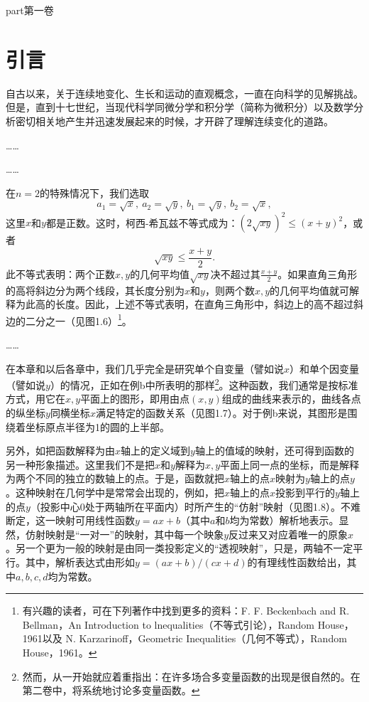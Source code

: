 part{第一卷}


\chapter{引言}
自古以来，关于连续地变化、生长和运动的直观概念，一直在向科学的见解挑战。但是，直到十七世纪，当现代科学同微分学和积分学（简称为微积分）以及数学分析密切相关地产生并迅速发展起来的时候，才开辟了理解连续变化的道路。

……


……

在$n=2$的特殊情况下，我们选取
$$
a_1=\sqrt{x},\ a_2=\sqrt{y},\ b_1=\sqrt{y},\ b_2=\sqrt{x},
$$
这里$x$和$y$都是正数。这时，柯西-希瓦兹不等式成为：$(2\sqrt{xy})^2\leqslant(x+y)^2$，或者
$$
\sqrt{xy}\leqslant\frac{x+y}{2}.
$$
此不等式表明：两个正数$x,y$的几何平均值$\sqrt{xy}$决不超过其$\frac{x+y}{2}$。如果直角三角形的高将斜边分为两个线段，其长度分别为$x$和$y$，则两个数$x,y$的几何平均值就可解释为此高的长度。因此，上述不等式表明，在直角三角形中，斜边上的高不超过斜边的二分之一（见图1.6）\footnote{有兴趣的读者，可在下列著作中找到更多的资料：F. F. Beckenbach and R. Bellman，An Introduction to lnequalities（不等式引论），Random House，1961以及 N. Karzarinoff，Geometric Inequalities（几何不等式），Random House，1961。}。


……

在本章和以后各章中，我们几乎完全是研究单个自变量（譬如说$x$）和单个因变量（譬如说$y$）的情况，正如在例b中所表明的那样\footnote{然而，从一开始就应着重指出：在许多场合多变量函数的出现是很自然的。在第二卷中，将系统地讨论多变量函数。}。这种函数，我们通常是按标准方式，用它在$x,y$平面上的图形，即用由点$(x,y)$组成的曲线来表示的，曲线各点的纵坐标$y$同横坐标$x$满足特定的函数关系（见图1.7）。对于例b来说，其图形是围绕着坐标原点半径为1的圆的上半部。


另外，如把函数解释为由$x$轴上的定义域到$y$轴上的值域的映射，还可得到函数的另一种形象描述。这里我们不是把$x$和$y$解释为$x,y$平面上同一点的坐标，而是解释为两个不同的独立的数轴上的点。于是，函数就把$x$轴上的点$x$映射为$y$轴上的点$y$。这种映射在几何学中是常常会出现的，例如，把$x$轴上的点$x$投影到平行的$y$轴上的点$y$（投影中心0处于两轴所在平面内）时所产生的“仿射”映射（见图1.8）。不难断定，这一映射可用线性函数$y=ax+b$（其中$a$和$b$均为常数）解析地表示。显然，仿射映射是“一对一”的映射，其中每一个映象$y$反过来又对应着唯一的原象$x$。另一个更为一般的映射是由同一类投影定义的“透视映射”，只是，两轴不一定平行。其中，解析表达式由形如$y=(ax+b)/(cx+d)$的有理线性函数给出，其中$a,b,c,d$均为常数。

